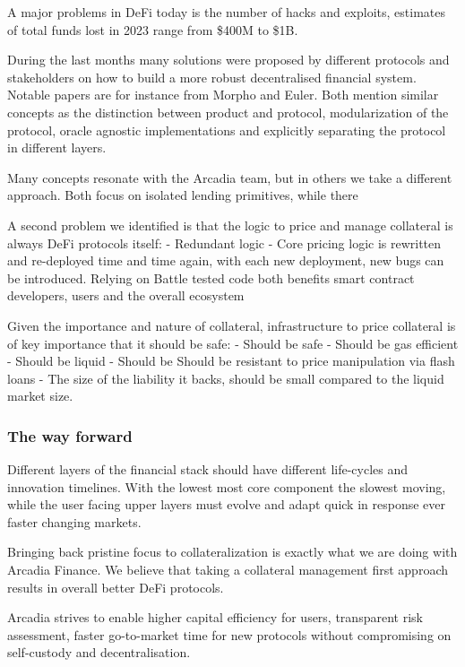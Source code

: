 \documentclass[sigconf,nonacm]{acmart}
\begin{document}
A major problems in DeFi today is the number of hacks and exploits, estimates of total funds lost in 2023 range from \$400M to \$1B.

During the last months many solutions were proposed by different protocols and stakeholders on how to build a more robust decentralised financial system.
Notable papers are for instance from Morpho\cite{gontier2023morpho} and Euler\cite{euler2023protocols}.
Both mention similar concepts as the distinction between product and protocol, modularization of the protocol, oracle agnostic implementations and explicitly separating the protocol in different layers.

Many concepts resonate with the Arcadia team, but in others we take a different approach.
Both focus on isolated lending primitives, while there

A second problem we identified is that the logic to price and manage collateral is always DeFi protocols itself:
- Redundant logic
- Core pricing logic is rewritten and re-deployed time and time again, with each new deployment, new bugs can be introduced.
Relying on Battle tested code both benefits smart contract developers, users and the overall ecosystem

Given the importance and nature of collateral, infrastructure to price collateral is of key importance that it should be safe:
- Should be safe
- Should be gas efficient
- Should be liquid
- Should be Should be resistant to price manipulation via flash loans
- The size of the liability it backs, should be small compared to the liquid market size.

\subsubsection{The way forward}

Different layers of the financial stack should have different life-cycles and innovation timelines.
With the lowest most core component the slowest moving, while the user facing upper layers must evolve and adapt quick in response ever faster changing markets.

Bringing back pristine focus to collateralization is exactly what we are doing with Arcadia Finance.
We believe that taking a collateral management first approach results in overall better DeFi protocols. 

Arcadia strives to enable higher capital efficiency for users, transparent risk assessment, faster go-to-market time for new protocols without compromising on self-custody and decentralisation.
\end{document}
